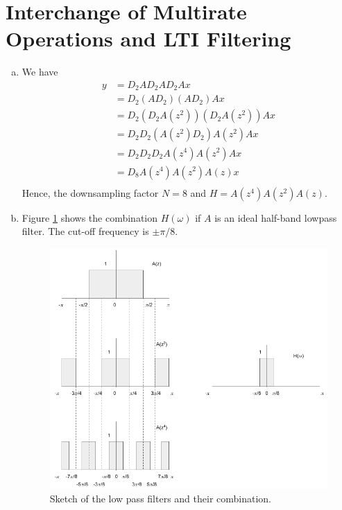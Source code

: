 \section{Interchange of Multirate Operations and LTI Filtering}\label{sec:p7}

\begin{enumerate}[(a)]
\item We have
\begin{align*}
	y
	&= D_2 A D_2 A D_2 A x \\
	&= D_2 (A D_2) (A D_2) A x \\
	&= D_2 (D_2 A(z^2)) (D_2 A(z^2)) A x \\
	&= D_2 D_2 (A(z^2) D_2) A(z^2) A x \\
	&= D_2 D_2 D_2 A(z^4) A(z^2) A x \\
	&= D_8 A(z^4) A(z^2) A(z) x \\
\end{align*}
Hence, the downsampling factor $N = 8$ and $H = A(z^4) A(z^2) A(z)$.

\item Figure \ref{fig:p7-2} shows the combination $H(\omega)$ if $A$ is an ideal half-band lowpass filter. The cut-off frequency is $\pm \pi/8$.
\begin{figure}[htbp]
	\centering
	\includegraphics[width=\textwidth]{images/p7-2}
	\caption{Sketch of the low pass filters and their combination.}
	\label{fig:p7-2}
\end{figure}


\end{enumerate}
